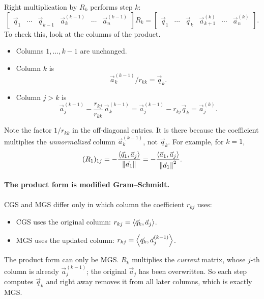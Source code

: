 Right multiplication by $R_k$ performs step $k$:
\begin{equation}
  \begin{bmatrix} \vec{q}_1 & \cdots & \vec{q}_{k-1} & \vec{a}_k^{(k-1)} & \cdots & \vec{a}_n^{(k-1)} \end{bmatrix}R_k = \begin{bmatrix} \vec{q}_1 & \cdots & \vec{q}_k & \vec{a}_{k+1}^{(k)} & \cdots & \vec{a}_n^{(k)} \end{bmatrix}.
\end{equation}
To check this, look at the columns of the product.
\begin{itemize}
  \item Columns $1, \dots, k-1$ are unchanged.
  \item Column $k$ is
  \begin{equation*}
    \vec{a}_k^{(k-1)}/r_{kk} = \vec{q}_k.
  \end{equation*}
  \item Column $j > k$ is
  \begin{equation*}
    \vec{a}_j^{(k-1)} - \frac{r_{kj}}{r_{kk}}\,\vec{a}_k^{(k-1)} = \vec{a}_j^{(k-1)} - r_{kj}\vec{q}_k = \vec{a}_j^{(k)}.
  \end{equation*}
\end{itemize}

Note the factor $1/r_{kk}$ in the off-diagonal entries. It is there because the coefficient multiplies the \emph{unnormalized} column $\vec{a}_k^{(k-1)}$, not $\vec{q}_k$. For example, for $k = 1$,
\begin{equation}
  (R_1)_{1j} = -\frac{\left\langle \vec{q}_1, \vec{a}_j \right\rangle}{\left\lVert \vec{a}_1 \right\rVert} = -\frac{\left\langle \vec{a}_1, \vec{a}_j \right\rangle}{\left\lVert \vec{a}_1 \right\rVert^2}.
\end{equation}

\paragraph{The product form is modified Gram--Schmidt.} CGS and MGS differ only in which column the coefficient $r_{kj}$ uses:
\begin{itemize}
  \item CGS uses the original column: $r_{kj} = \left\langle \vec{q}_k, \vec{a}_j \right\rangle$.
  \item MGS uses the updated column: $r_{kj} = \left\langle \vec{q}_k, \vec{a}_j^{(k-1)} \right\rangle$.
\end{itemize}
The product form can only be MGS. $R_k$ multiplies the \emph{current} matrix, whose $j$-th column is already $\vec{a}_j^{(k-1)}$; the original $\vec{a}_j$ has been overwritten. So each step computes $\vec{q}_k$ and right away removes it from all later columns, which is exactly MGS.

